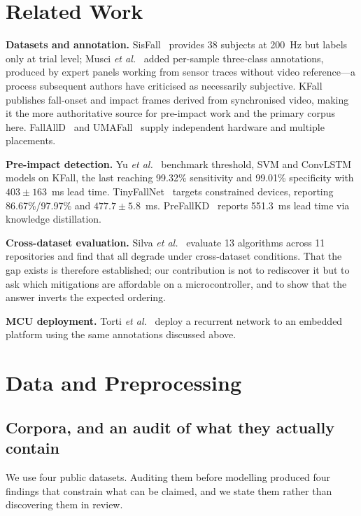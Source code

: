 \documentclass[conference]{IEEEtran}
\begin{document}
\section{Related Work}

\textbf{Datasets and annotation.} SisFall~\cite{sucerquia2017sisfall} provides 38
subjects at 200~Hz but labels only at trial level; Musci \emph{et
al.}~\cite{musci2020online} added per-sample three-class annotations, produced by
expert panels working from sensor traces without video reference---a process
subsequent authors have criticised as necessarily subjective. KFall~\cite{yu2021kfall}
publishes fall-onset and impact frames derived from synchronised video, making it the
more authoritative source for pre-impact work and the primary corpus here.
FallAllD~\cite{saleh2020fallalld} and UMAFall~\cite{casilari2017umafall} supply
independent hardware and multiple placements.

\textbf{Pre-impact detection.} Yu \emph{et al.}~\cite{yu2021kfall} benchmark
threshold, SVM and ConvLSTM models on KFall, the last reaching 99.32\% sensitivity and
99.01\% specificity with $403\pm163$~ms lead time.
TinyFallNet~\cite{tinyfallnet2023} targets constrained devices, reporting
86.67\%/97.97\% and $477.7\pm5.8$~ms. PreFallKD~\cite{prefallkd2023} reports 551.3~ms
lead time via knowledge distillation.

\textbf{Cross-dataset evaluation.} Silva \emph{et al.}~\cite{silva2024crossdataset}
evaluate 13 algorithms across 11 repositories and find that all degrade under
cross-dataset conditions. That the gap exists is therefore established; our
contribution is not to rediscover it but to ask which mitigations are affordable on a
microcontroller, and to show that the answer inverts the expected ordering.

\textbf{MCU deployment.} Torti \emph{et al.}~\cite{torti2019embedding} deploy a
recurrent network to an embedded platform using the same annotations discussed above.

\section{Data and Preprocessing}
\label{sec:data}

\subsection{Corpora, and an audit of what they actually contain}

We use four public datasets. Auditing them before modelling produced four findings
that constrain what can be claimed, and we state them rather than discovering them in
review.
\end{document}
